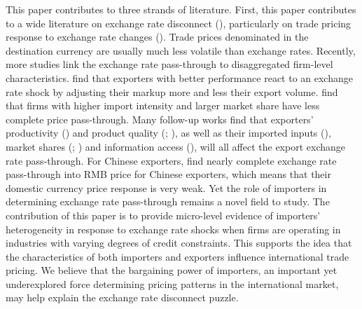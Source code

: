 \documentclass[12pt]{article}
\begin{document}
This paper contributes to three strands of literature. First, this paper contributes to a wide literature on exchange rate disconnect (\cite{obstfeld2000}), particularly on trade pricing response to exchange rate changes (\cite{campa2005}). Trade prices denominated in the destination currency are usually much less volatile than exchange rates. Recently, more studies link the exchange rate pass-through to disaggregated firm-level characteristics. \cite{bmm2012} find that exporters with better performance react to an exchange rate shock by adjusting their markup more and less their export volume. \cite{aik2014} find that firms with higher import intensity and larger market share have less complete price pass-through. Many follow-up works find that exporters' productivity (\cite{lmx2015}) and product quality (\cite{chen2016}; \cite{auer2018}), as well as their imported inputs (\cite{wang-yu2021}), market shares (\cite{auer2016}; \cite{devereux2017}) and information access (\cite{garetto2016}), will all affect the export exchange rate pass-through. For Chinese exporters, \cite{lmx2015} find nearly complete exchange rate pass-through into RMB price for Chinese exporters, which means that their domestic currency price response is very weak. Yet the role of importers in determining exchange rate pass-through remains a novel field to study. The contribution of this paper is to provide micro-level evidence of importers' heterogeneity in response to exchange rate shocks when firms are operating in industries with varying degrees of credit constraints. This supports the idea that the characteristics of both importers and exporters influence international trade pricing. We believe that the bargaining power of importers, an important yet underexplored force determining pricing patterns in the international market, may help explain the exchange rate disconnect puzzle. 
\end{document}

